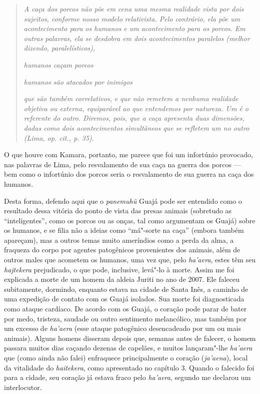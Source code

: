 \begin{quote}
\emph{A caça dos porcos não põe em cena uma mesma realidade vista por dois
sujeitos, conforme nosso modelo relativista. Pelo contrário, ela põe um
acontecimento para os humanos e um acontecimento para os porcos. Em
outras palavras, ela se desdobra em dois acontecimentos paralelos
(melhor dizendo, paralelísticos),}

\emph{humanos caçam porcos}

\emph{humanos são atacados por inimigos}

\emph{que são também correlativos, e que não remetem a nenhuma realidade
objetiva ou externa, equiparável ao que entendemos por natureza. Um é o
referente do outro. Diremos, pois, que a caça apresenta duas dimensões,
dadas como dois acontecimentos simultâneos que se refletem um no outro
(Lima, \emph{op. cit.}, p. 35)}.
\end{quote}

O que houve com Kamara, portanto, me parece que foi um infortúnio
provocado, nas palavras de Lima, pelo resvalamento de sua caça na guerra
dos porcos --- bem como o infortúnio dos porcos seria o resvalamento de
sua guerra na caça dos humanos.

Desta forma, defendo aqui que o \emph{panemuhũ} Guajá pode ser entendido
como o resultado dessa vitória do ponto de vista das presas animais
(sobretudo as ``inteligentes'', como os porcos ou as onças, tal como
argumentam os Guajá) sobre os humanos, e se filia não a ideias como
``má"-sorte na caça'' (embora também apareçam), mas a outros temas muito
ameríndios como a perda da alma, a fraqueza do corpo por agentes
patogênicos provenientes dos animais, além de outros males que acometem
os humanos, uma vez que, pelo \emph{ha'aera}, estes têm seu
\emph{hajtekera} prejudicado, o que pode, inclusive, levá"-lo à morte.
Assim me foi explicada a morte de um homem da aldeia Juriti no ano de
2007. Ele faleceu subitamente, dormindo, enquanto estava na cidade de
Santa Inês, a caminho de uma expedição de contato com os Guajá isolados.
Sua morte foi diagnosticada como ataque cardíaco. De acordo com os
Guajá, o coração pode parar de bater por medo, tristeza, saudade ou
outro sentimento melancólico, mas também por um excesso de
\emph{ha'aera} (esse ataque patogênico desencadeado por um ou mais
animais). Alguns homens disseram depois que, semanas antes de falecer, o
homem passara muitos dias caçando dezenas de capelães, e muitos
lançaram"-lhe \emph{ha'aera} que (como ainda não falei) enfraquece
principalmente o coração (\emph{ja'aena}), local da vitalidade do
\emph{haitekera}, como apresentado no capítulo 3. Quando o falecido foi
para a cidade, seu coração já estava fraco pelo \emph{ha'aera}, segundo
me declarou um interlocutor.

